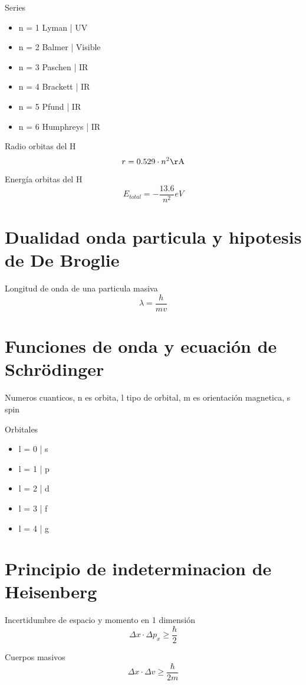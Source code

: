 \documentclass[12pt, letterpaper, twoside]{article}
\begin{document}
	Series
	\begin{itemize}
		\item n = 1 Lyman | UV
		\item n = 2 Balmer | Visible
		\item n = 3 Paschen | IR
		\item n = 4 Brackett | IR
		\item n = 5 Pfund | IR
		\item n = 6 Humphreys | IR
	\end{itemize}

	Radio orbitas del H
	\begin{equation}
		r = 0.529 \cdot n^2 \si{\AA}
	\end{equation}

	Energía orbitas del H
	\begin{equation}
		E_{total} = - \frac{13.6}{n^2} \si{eV}
	\end{equation}

	\section{Dualidad onda particula y hipotesis de De Broglie}
	
	Longitud de onda de una particula masiva
	\begin{equation}
		\lambda = \frac{h}{mv}
	\end{equation}


	\section{Funciones de onda y ecuación de Schrödinger}
	Numeros cuanticos, n es orbita, l tipo de orbital, m es orientación magnetica, s spin

	Orbitales
	\begin{itemize}
		\item l = 0 | s
		\item l = 1 | p
		\item l = 2 | d
		\item l = 3 | f
		\item l = 4 | g
	\end{itemize}

	\section{Principio de indeterminacion de Heisenberg}
	
	Incertidumbre de espacio y momento en 1 dimensión
	\begin{equation}
		\Delta x \cdot \Delta p_x \geq \frac{\hbar}{2}
	\end{equation}

	Cuerpos masivos
	\begin{equation}
		\Delta x \cdot \Delta v \geq \frac{\hbar}{2m}
	\end{equation}
\end{document}
